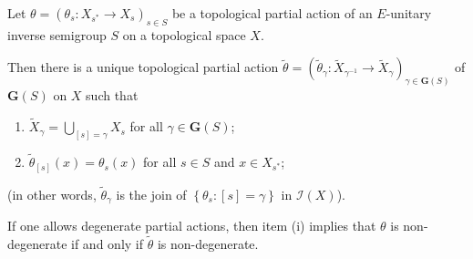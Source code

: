 \begin{theorem}\label{theoremfactorpartialactioneunitary}
Let $\theta=(\theta_s:X_{s^*}\to X_s)_{s\in S}$ be a topological partial action of an $E$-unitary inverse semigroup $S$ on a topological space $X$.

Then there is a unique topological partial action $\widetilde{\theta}=\left(\widetilde{\theta}_\gamma:\widetilde{X}_{\gamma^{-1}}\to\widetilde{X}_\gamma\right)_{\gamma\in\mathbf{G}(S)}$ of $\mathbf{G}(S)$ on $X$ such that
\begin{enumerate}
\item[(i)] $\widetilde{X}_\gamma=\bigcup_{[s]=\gamma}X_s$ for all $\gamma\in \mathbf{G}(S)$;
\item[(ii)] $\widetilde{\theta}_{[s]}(x)=\theta_s(x)$ for all $s\in S$ and $x\in X_{s^*}$;
\end{enumerate}
(in other words, $\widetilde{\theta}_{\gamma}$ is the join of $\left\{\theta_s:[s]=\gamma\right\}$ in $\mathcal{I}(X)$). 
\end{theorem}

\begin{remark}
If one allows degenerate partial actions, then item (i) implies that $\theta$ is non-degenerate if and only if $\widetilde{\theta}$ is non-degenerate.
\end{remark}


